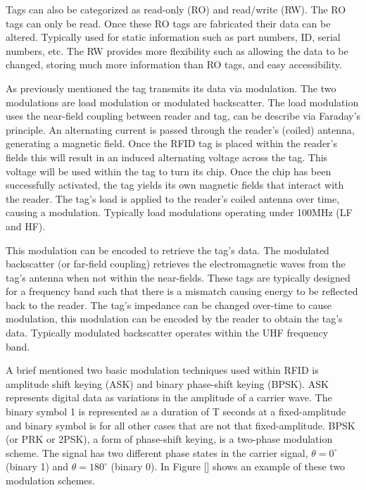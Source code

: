 Tags can also be categorized as read-only (RO) and read/write (RW). The RO tags can only be read. Once these RO tags are fabricated their data can be altered. Typically used for static information such as part numbers, ID, serial numbers, etc. The RW provides more flexibility such as allowing the data to be changed, storing much more information than RO tags, and easy accessibility.   

As previously mentioned the tag transmits its data via modulation. The two modulations are load modulation or modulated backscatter. The load modulation uses the near-field coupling between reader and tag, can be describe via Faraday's principle. An alternating current is passed through the reader's (coiled) antenna, generating a magnetic field. Once the RFID tag is placed within the reader's fields this will result in an induced alternating voltage across the tag. This voltage will be used within the tag to turn its chip. Once the chip has been successfully activated, the tag yields its own magnetic fields that interact with the reader. The tag's load is applied to the reader's coiled antenna over time, causing a modulation. Typically load modulations operating under 100MHz (LF and HF).

This modulation can be encoded to retrieve the tag's data. The modulated backscatter (or far-field coupling) retrieves the electromagnetic waves from the tag's antenna when not within the near-fields. These tags are typically designed for a frequency band such that there is a mismatch causing energy to be reflected back to the reader. The tag's impedance can be changed over-time to cause modulation, this modulation can be encoded by the reader to obtain the tag's data. Typically modulated backscatter operates within the UHF frequency band. 

A brief mentioned two basic modulation techniques used within RFID is amplitude shift keying (ASK) and binary phase-shift keying (BPSK). ASK represents digital data as variations in the amplitude of a carrier wave. The binary symbol 1 is represented as a duration of T seconds at a fixed-amplitude and binary symbol is for all other cases that are not that fixed-amplitude. BPSK (or PRK or 2PSK), a form of phase-shift keying, is a two-phase modulation scheme. The signal has two different phase states in the carrier signal, $\theta=0^\circ$ (binary 1) and $\theta=180^\circ$ (binary 0). In Figure [] shows an example of these two modulation schemes.




